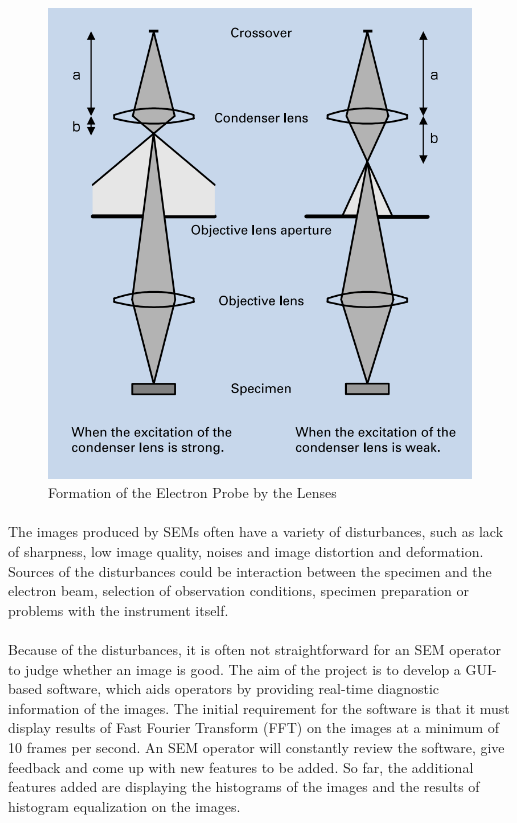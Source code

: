 \documentclass[12pt,a4paper]{article}
\begin{document}
\begin{figure}[h!]
  \centering
  \includegraphics[scale=0.5]{"Lenses"}
  \caption{Formation of the Electron Probe by the Lenses \cite{SEMAToZ}}
  \label{fig:Lenses}
\end{figure}

\paragraph{}
The images produced by SEMs often have a variety of disturbances, such as lack of sharpness, low image quality, noises and image distortion and deformation. Sources of the disturbances could be interaction between the specimen and the electron beam, selection of observation conditions, specimen preparation or problems with the instrument itself.

\paragraph{}
Because of the disturbances, it is often not straightforward for an SEM operator to judge whether an image is good. The aim of the project is to develop a GUI-based software, which aids operators by providing real-time diagnostic information of the images. The initial requirement for the software is that it must display results of Fast Fourier Transform (FFT) on the images at a minimum of 10 frames per second. An SEM operator will constantly review the software, give feedback and come up with new features to be added. So far, the additional features added are displaying the histograms of the images and the results of histogram equalization on the images.
\end{document}

